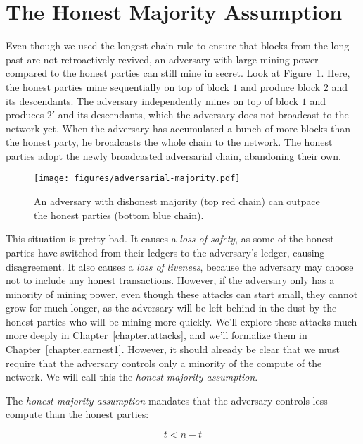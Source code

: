 \section{The Honest Majority Assumption}


Even though we used the longest chain rule to ensure that blocks from the long past are not
retroactively revived, an adversary with large mining power compared to the honest parties can
still mine in secret. Look at Figure~\ref{fig.adversarial-majority}. Here, the honest parties
mine sequentially on top of block $1$ and produce block $2$ and its descendants.
The adversary independently mines on top of block $1$ and produces $2'$ and its descendants,
which the adversary does not broadcast to the network yet. When the adversary has accumulated
a bunch of more blocks than the honest party, he broadcasts the whole chain to the network.
The honest parties adopt the newly broadcasted adversarial chain, abandoning their own.

\begin{figure}[h]
    \centering
    \texttt{[image: figures/adversarial-majority.pdf]}
    \caption{An adversary with dishonest majority (top red chain) can outpace the honest parties (bottom
             blue chain).}
    \label{fig.adversarial-majority}
\end{figure}

This situation is pretty bad. It causes a \emph{loss of safety}, as some of the honest parties have
switched from their ledgers to the adversary's ledger, causing disagreement. It also causes a
\emph{loss of liveness}, because the adversary may choose not to include any honest transactions.
However, if the adversary
only has a minority of mining power, even though these attacks can start small, they cannot grow
for much longer, as the adversary will be left behind in the dust by the honest parties who will
be mining more quickly.
We'll explore these attacks much more deeply in Chapter~\ref{chapter.attacks},
and we'll formalize them in Chapter~\ref{chapter.earnest1}. However, it should already be clear
that we must require that the adversary controls only a minority of the compute of the network.
We will call this the \emph{honest majority assumption}.

\begin{definition}
  The \emph{honest majority assumption} mandates that the adversary controls less compute than
  the honest parties:

  \[
    t < n - t
  \]
\end{definition}


